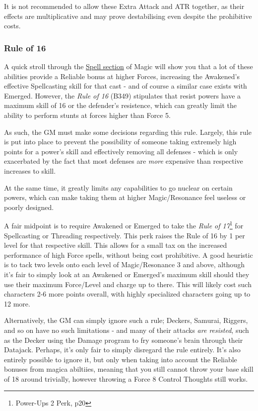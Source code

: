\begin{multicols*}{3}
	It is not recommended to allow these Extra Attack and ATR together, as their effects are multiplicative and may prove destabilising even despite the prohibitive costs.
	
	\subsubsection{Rule of 16}
	
	A quick stroll through the \hyperref[spells]{Spell section} of Magic will show you that a lot of these abilities provide a Reliable bonus at higher Forces, increasing the Awakened's effective Spellcasting skill for that cast - and of course a similar case exists with Emerged. However, the \textit{Rule of 16} (B349) stipulates that resist powers have a maximum skill of 16 or the defender's resistence, which can greatly limit the ability to perform stunts at forces higher than Force 5.
	
	As such, the GM must make some decisions regarding this rule. Largely, this rule is put into place to prevent the possibility of someone taking extremely high points for a power's skill and effectively removing all defenses - which is only exacerbated by the fact that most defenses are \textit{more} expensive than respective increases to skill.
	
	At the same time, it greatly limits any capabilities to go nuclear on certain powers, which can make taking them at higher Magic/Resonance feel useless or poorly designed.
	
	A fair midpoint is to require Awakened or Emerged to take the \textit{Rule of 17}\footnote{Power-Ups 2 Perk, p20} for Spellcasting or Threading respectively. This perk raises the Rule of 16 by 1 per level for that respective skill. This allows for a small tax on the increased performance of high Force spells, without being cost prohibitive. A good heuristic is to tack two levels onto each level of Magic/Resonance 3 and above, although it's fair to simply look at an Awakened or Emerged's maximum skill should they use their maximum Force/Level and charge up to there. This will likely cost such characters 2-6 more points overall, with highly specialized characters going up to 12 more.
	
	Alternatively, the GM can simply ignore such a rule; Deckers, Samurai, Riggers, and so on have no such limitations - and many of their attacks \textit{are resisted}, such as the Decker using the Damage program to fry someone's brain through their Datajack. Perhaps, it's only fair to simply disregard the rule entirely. It's also entirely possible to ignore it, but only when taking into account the Reliable bonuses from magica abiltiies, meaning that you still cannot throw your base skill of 18 around trivially, however throwing a Force 8 Control Thoughts still works.
	
\end{multicols*}
